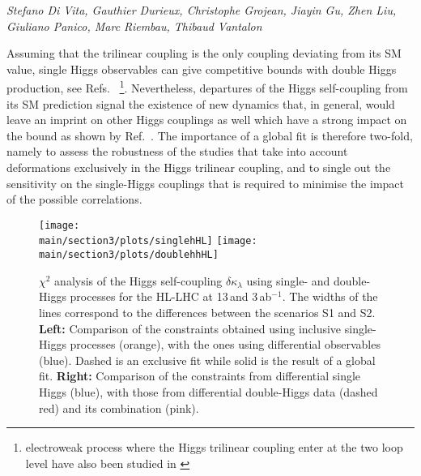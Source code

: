 \begin{center}
	\textit{Stefano Di Vita, Gauthier Durieux, Christophe Grojean, Jiayin Gu, Zhen Liu, Giuliano Panico, Marc Riembau, Thibaud Vantalon}
\end{center} 

Assuming that the trilinear coupling is the only coupling deviating from its SM value, single Higgs observables can give competitive bounds with double Higgs production, see Refs.~\cite{Gorbahn:2016uoy,Degrassi:2016wml,Bizon:2016wgr,Degrassi:2017ucl,Maltoni:2017ims} \footnote{electroweak process where the Higgs trilinear coupling enter at the two loop level have also been studied in \cite{Kribs:2017znd}}. Nevertheless, departures of the Higgs self-coupling from its SM prediction signal the existence of new dynamics that, in general, would leave an imprint on other Higgs couplings as well which have a strong impact on the bound as shown by Ref.~\cite{DiVita:2017eyz}. The importance of a global fit is therefore two-fold, namely to assess the robustness of the studies that take into account deformations exclusively in the Higgs trilinear coupling, and to single out the sensitivity on the single-Higgs couplings that is required to minimise the impact of the possible correlations.
\medskip

\begin{figure}
	\centering
	\texttt{[image: \\main/section3/plots/singlehHL]}\hfill
	\texttt{[image: \\main/section3/plots/doublehhHL]}
	\caption{$\chi^2$ analysis of the Higgs self-coupling $\delta \kappa_\lambda$ using single- and double-Higgs processes for the HL-LHC at 13\,\UTeV and 3\,ab$^{-1}$. The widths of the lines correspond to the differences between the scenarios S1 and S2. \textbf{Left:} Comparison of the constraints obtained using inclusive single-Higgs processes (orange), with the ones using differential observables (blue). Dashed is an exclusive fit while solid is the result of a global fit. \textbf{Right:} Comparison of the constraints from differential single Higgs (blue), with those from differential double-Higgs data (dashed red) and its combination (pink).}
	\label{fig:hllhcchi2}
\end{figure}

